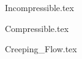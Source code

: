 \documentclass[a4paper, 12pt]{report}
\begin{document}
\begin{center}
\begin{comment}
Start Level: Chapter
End Level: Chapter
Aditional Comments:
\end{comment}
{Incompressible.tex}
\begin{comment}
Start Level: Chapter
End Level: Chapter
Aditional Comments:
\end{comment}
{Compressible.tex}
\begin{comment}
Start Level: Chapter
End Level: Chapter
Aditional Comments:
\end{comment}
{Creeping_Flow.tex}
\begin{comment}
Start Level: Chapter
End Level: Chapter
Aditional Comments:
\end{comment}

\end{center}
\end{document}
